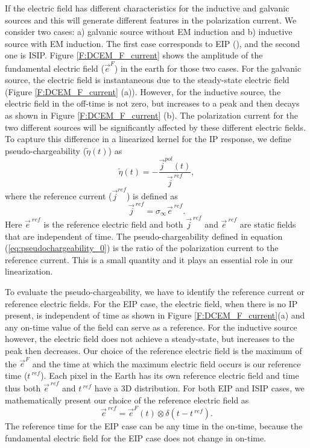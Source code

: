 \documentclass[a4paper, 11pt]{article}
\newcommand{\siginf}{\sigma_\infty}
\renewcommand {\j}  { {\vec j} }
\newcommand {\e}  { {\vec e} }
\newcommand{\peta}{\tilde{\eta}}
\newcommand{\eref}{\e^{\ ref}}
\begin{document}
If the electric field has different characteristics for the inductive and galvanic sources and this will generate different features in the polarization current.  
We consider two cases: a) galvanic source without EM induction and b) inductive source with EM induction. The first case corresponds to EIP (\cite{seigel1959}), and the second one is ISIP.
Figure \ref{F:DCEM_F_current} shows the amplitude of the fundamental electric field ($\e^{F}$) in the earth for those two cases. 
For the galvanic source, the electric field is instantaneous due to the steady-state electric field (Figure \ref{F:DCEM_F_current} (a)). 
However, for the inductive source, the electric field in the off-time is not zero, but increases to a peak and then decays as shown in Figure \ref{F:DCEM_F_current} (b). 
The polarization current for the two different sources will be significantly affected by these different electric fields. 
To capture this difference in a linearized kernel for the IP response, we define pseudo-chargeability ($\peta(t)$) as 
\begin{equation}
  \peta(t) = -\frac{\j^{pol}(t)}{\j^{\ ref}},
  \label{eq:pseudochargeability_0}
\end{equation}
where the reference current ($\j^{ref}$) is defined as 
\begin{equation}
  \j^{\ ref} = \siginf \eref.
  \label{eq:reference_current}
\end{equation}
Here $\eref$ is the reference electric field and both $\j^{\ ref}$ and $\eref$ are static fields that are independent of time. 
The pseudo-chargeability defined in equation (\ref{eq:pseudochargeability_0})  is the ratio of  the polarization current to the reference current. This is a small quantity and it plays an essential role in our linearization. 

To evaluate the pseudo-chargeability, we have to identify the reference current or reference electric fields. For the EIP case, the electric field, when there is no IP present, is independent of time as shown in Figure \ref{F:DCEM_F_current}(a) and any on-time value of the field can serve as a reference. For the inductive source however, the electric field does not achieve a steady-state, but increases to the peak then decreases. Our choice of the reference electric field is the maximum of the $\e^{F}$ and the  time at which the  maximum electric field occurs is our reference time ($t^{\ ref}$).
Each pixel in the Earth has its own reference electric field and time thus  both $\eref$ and $t^{\ ref}$ have a 3D distribution. 
For both EIP and ISIP cases, we mathematically present our choice of the reference electric field as
\begin{equation}
  \eref = \e^{F}(t) \otimes \delta(t-t^{\ ref}). 
  \label{eq:reference_electricfield}
\end{equation}
The reference time for the EIP case can be any time in the on-time, because the fundamental electric field for the EIP case does not change in on-time. 
\end{document}
